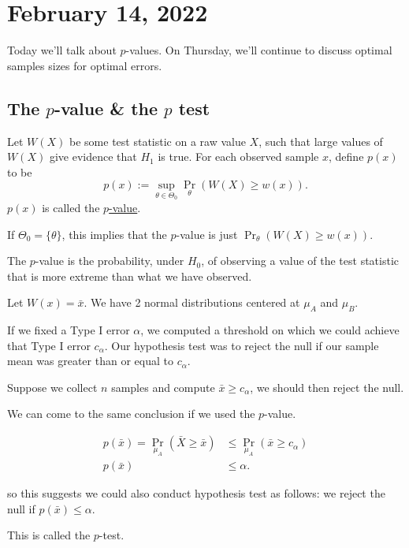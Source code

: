 \section{February 14, 2022}
Today we'll talk about $p$-values. On Thursday, we'll continue to discuss optimal samples sizes for optimal errors.

\subsection{The \texorpdfstring{$p$}{p}-value \& the \texorpdfstring{$p$}{p} test}

\begin{definition}[$p$-value]
    Let $W(X)$ be some test statistic on a raw value $X$, such that large values of $W(X)$ give evidence that $H_1$ is true. For each observed sample $x$, define $p(x)$ to be
    \[p(x) := \sup_{\theta\in \Theta_0} \Pr_{\theta}(W(X) \geq w(x)).\]
    $p(x)$ is called the \ul{$p$-value}.
\end{definition}

\begin{example}
    If $\Theta_0 = \{\theta\}$, this implies that the $p$-value is just $\Pr_{\theta}(W(X) \geq w(x))$.
\end{example}

The $p$-value is the probability, under $H_0$, of observing a value of the test statistic that is more extreme than what we have observed.

\begin{example}
    Let $W(x) = \bar{x}$. We have 2 normal distributions centered at $\mu_A$ and $\mu_B$.

    If we fixed a Type I error $\alpha$, we computed a threshold on which we could achieve that Type I error $c_\alpha$. Our hypothesis test was to reject the null if our sample mean was greater than or equal to $c_\alpha$.

    Suppose we collect $n$ samples and compute $\bar{x} \geq c_\alpha$, we should then reject the null.

    We can come to the same conclusion if we used the $p$-value.

    \begin{align*}
        p(\bar{x}) = \Pr_{\mu_A}(\bar{X} \geq \bar{x}) & \leq \Pr_{\mu_A}(\bar{x} \geq c_\alpha) \\
        p(\bar{x})                                     & \leq \alpha.
    \end{align*}

    so this suggests we could also conduct hypothesis test as follows: we reject the null if $p(\bar{x})\leq \alpha$.

    This is called the $p$-test.
\end{example}

